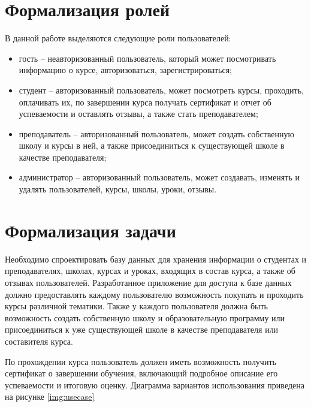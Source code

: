 \section{Формализация ролей}
В данной работе выделяются следующие роли пользователей:
\begin{itemize}
    \item гость -- неавторизованный пользователь, который может посмотривать информацию о курсе,
    авторизоваться, зарегистрироваться;
    \item студент -- авторизованный пользователь, может посмотреть курсы, проходить, оплачивать их,
    по завершении курса получать сертификат и отчет об успеваемости и оставлять отзывы,
    а также стать преподавателем;
    \item преподаватель -- авторизованный пользователь, может создать собственную школу и курсы в ней,
    а также присоединиться к существующей школе в качестве преподавателя;
    \item администратор -- авторизованный пользователь, может создавать, изменять и удалять пользователей, курсы, школы, уроки, отзывы.
\end{itemize}

\section{Формализация задачи}
Необходимо спроектировать базу данных для хранения информации о студентах и преподавателях, школах, курсах и уроках, входящих в состав курса, а также об отзывах пользователей.
Разработанное приложение для доступа к базе данных должно предоставлять каждому пользователю возможность покупать и проходить курсы различной тематики. Также у каждого пользователя должна быть возможность создать собственную школу и образовательную программу
или присоединиться к уже существующей школе в качестве преподавателя или составителя курса.

По прохождении курса пользователь должен иметь возможность получить сертификат о завершении обучения,
включающий подробное описание его успеваемости и итоговую оценку. Диаграмма вариантов использования приведена на рисунке \ref{img:usecase}

